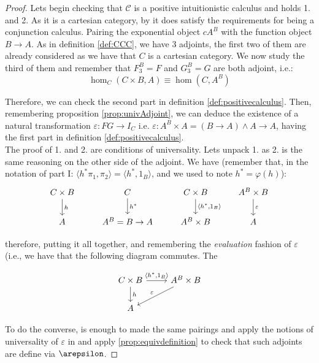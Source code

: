 \begin{proof}
  
  Lets begin checking that $\mathcal{C}$ is a positive intuitionistic calculus and holds 1. and 2. As it is a cartesian category, by it does satisfy the requirements for being a conjunction calculus. Pairing the exponential object $cA^B$ with the function object $B\to A$. As in definition \ref{def:CCC}, we have  3 adjoints, the first two of them are already considered as we have that $C$ is a cartesian category. We now study the third of them and remember that $F_3^B=F$ and $G_3^B=G$ are both adjoint, i.e.:
  $$\hom_C(C \times B, A) \equiv \hom(C, A^B)$$

  Therefore, we can check the second part in definition \ref{def:positivecalculus}. Then, remembering proposition \ref{prop:univAdjoint}, we can deduce the existence of a natural transformation  $\varepsilon: FG \to I_C$ i.e. $\varepsilon: A^B\times A = (B\to A)\land A \to A$, having the first part in definition \ref{def:positivecalculus}.\\

  The proof of 1. and 2. are conditions of universality. Lets unpack 1. as 2. is the same reasoning on the other side of the adjoint. We have (remember that, in the notation of part I: $\langle h^*\pi_1, \pi_2\rangle = \langle h^*,1_B\rangle$, and we used to note $h^*=\varphi(h)$):
  \[
    \begin{tikzcd}
      C\times B\arrow{d}{h}&C\arrow{d}{h^*} & C\times B\arrow{d}{\langle h^*,1_B\rangle} & A^B\times B\arrow{d}{\varepsilon}\\
      A & A^B = B\to A & A^B\times B & A 
    \end{tikzcd}
  \]

  therefore, putting it all together, and remembering the \emph{evaluation} fashion of $\varepsilon$ (i.e., we have that the following diagram commutes. The 

  \[
    \begin{tikzcd}
      C\times B\arrow{d}{h} \arrow{r}{\langle h^*,1_B\rangle}& A^B\times B \arrow[swap]{dl}{\varepsilon}\\
      A&
    \end{tikzcd}
  \]

  
  To do the converse, is enough to made the same pairings and apply the notions of universality of $\varepsilon$ in  and apply \ref{prop:equivdefinition} to check that such adjoints are define via $\arepsilon$.
\end{proof}

